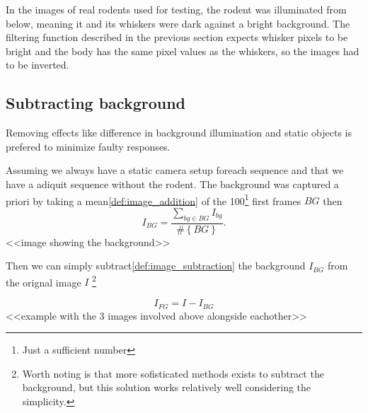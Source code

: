 In the images of real rodents used for testing, the rodent was
illuminated from below, meaning it and its whiskers were dark against
a bright background. The filtering function described in the previous
section expects whisker pixels to be bright and the body has the same 
pixel values as the whiskers, so the images had to be inverted.

\subsection{Subtracting background}
    Removing effects like difference in background illumination 
    and static objects is prefered to minimize faulty responses. 

    Assuming we always have a static camera setup foreach sequence and 
    that we have a adiquit sequence without the rodent.
    The background was captured a priori by taking a mean\ref{def:image_addition} 
    of the 100\footnote{Just a sufficient number} first frames $BG$ then
    \begin{equation}
        I_{BG} = \frac{\sum\limits_{bg\in BG}{I_{bg}}}{\#\left\{BG\right\}}.
    \end{equation}
    <<image showing the background>>

    Then we can simply subtract\ref{def:image_subtraction} the background $I_{BG}$ 
    from the orignal image $I$
    \footnote{
    Worth noting is that more sofisticated methods exists to subtract the background, 
    but this solution works relatively well considering the simplicity.
    }
   
    \begin{equation}
        I_{FG} = I - I_{BG}
    \end{equation}
    <<example with the 3 images involved above alongside eachother>>


